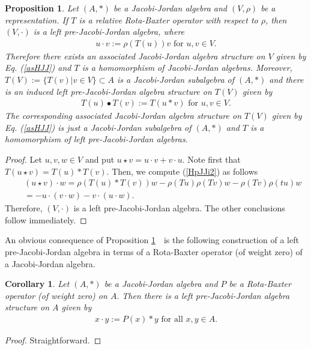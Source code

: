 \documentclass[12pt]{amsart}
\newtheorem{proposition}[Theorem]{Proposition}
\newtheorem{corollary}[Theorem]{Corollary}
\begin{document}
\begin{proposition}\label{HJJpJJ}
	Let $(A,\ast)$ be a Jacobi-Jordan algebra and $(V, \rho)$ be a representation. If $T$ is
	a relative Rota-Baxter operator with respect to $\rho$, then $(V, \cdot)$ is a left pre-Jacobi-Jordan algebra, where
	\begin{eqnarray}
		u\cdot v:=\rho(T(u))v \mbox{ for $u,v\in V$.} \label{revasHJJ1}
	\end{eqnarray}
	Therefore there exists an associated Jacobi-Jordan algebra structure on $V$ given by Eq. (\ref{asHJJ}) and $T$
	is a homomorphism of Jacobi-Jordan algebras. Moreover, $T(V):=\{T(v)|v\in V\} \subset A$ is a Jacobi-Jordan
	subalgebra of $(A, \ast)$ and there is an induced left pre-Jacobi-Jordan algebra structure on $T(V)$ given
	by
	\begin{eqnarray}
		T(u)\bullet T(v):=T(u\ast v) \mbox{ for $u,v\in V$.} \label{revasHJJ2}
	\end{eqnarray}
	The corresponding associated Jacobi-Jordan algebra structure on $T(V)$ given by Eq. (\ref{asHJJ}) is just a
	Jacobi-Jordan subalgebra of $(A, \ast)$ and $T$ is a homomorphism of left pre-Jacobi-Jordan algebras.
\end{proposition}
\begin{proof}
	Let $u, v, w\in V$ and put  
	$u\star v=u\cdot v + v\cdot u.$ Note
	first that $T(u\star v) = T(u)\ast T(v).$ Then, we compute 
	(\ref{HpJJi2}) as follows
	\begin{eqnarray}
		&&(u\star v)\cdot w=\rho(T(u)\ast T(v))w-\rho(T u)\rho(Tv)w-\rho(T v)\rho(tu)w\nonumber\\
		&&=-u\cdot(v\cdot w)-v\cdot(u\cdot w).\nonumber
	\end{eqnarray}
	Therefore, $(V, \cdot)$ is a left pre-Jacobi-Jordan algebra. The other conclusions follow immediately.
\end{proof}
An obvious consequence of Proposition \ref{HJJpJJ} \,\ is the following construction of a left pre-Jacobi-Jordan algebra in terms of a Rota-Baxter operator (of weight zero) of a Jacobi-Jordan algebra.
\begin{corollary}
	Let $(A,\ast)$ be a Jacobi-Jordan algebra and $P$ be a Rota-Baxter operator (of weight
	zero) on $A.$ Then there is a left pre-Jacobi-Jordan algebra structure on $A$ given by
	\begin{eqnarray}
		x\cdot y:=P(x)\ast y \mbox{ for all $x,y\in A.$}
	\end{eqnarray}
\end{corollary}
\begin{proof}
	Straightforward.
\end{proof}
\end{document}
